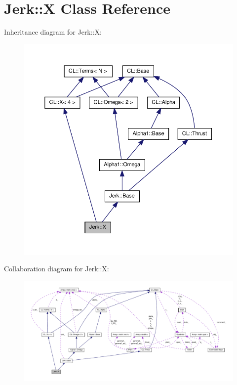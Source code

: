 \hypertarget{classJerk_1_1X}{\section{\-Jerk\-:\-:\-X \-Class \-Reference}
\label{classJerk_1_1X}
}


\-Inheritance diagram for \-Jerk\-:\-:\-X\-:\nopagebreak
\begin{figure}[H]
\begin{center}
\leavevmode
\includegraphics[width=350pt]{classJerk_1_1X__inherit__graph}
\end{center}
\end{figure}


\-Collaboration diagram for \-Jerk\-:\-:\-X\-:\nopagebreak
\begin{figure}[H]
\begin{center}
\leavevmode
\includegraphics[width=350pt]{classJerk_1_1X__coll__graph}
\end{center}
\end{figure}
